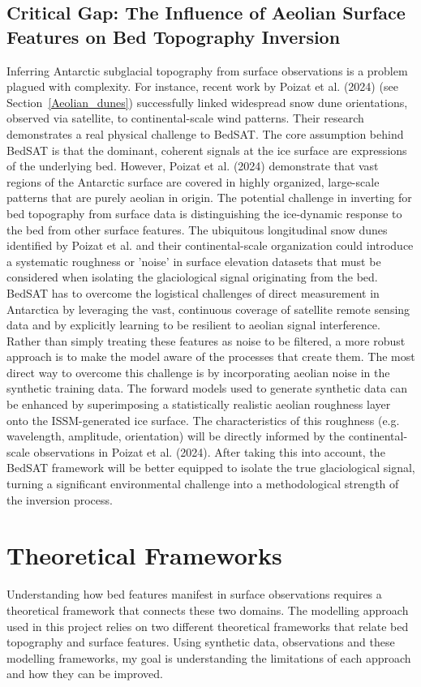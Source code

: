 \subsection{Critical Gap: The Influence of Aeolian Surface Features on Bed Topography Inversion}
Inferring Antarctic subglacial topography from surface observations is a problem plagued with complexity. For instance, recent work by Poizat et al. (2024) (see Section~\ref{Aeolian_dunes}) successfully linked widespread snow dune orientations, observed via satellite, to continental-scale wind patterns. Their research demonstrates a real physical challenge to BedSAT. The core assumption behind BedSAT is that the dominant, coherent signals at the ice surface are expressions of the underlying bed. However, Poizat et al. (2024) demonstrate that vast regions of the Antarctic surface are covered in highly organized, large-scale patterns that are purely aeolian in origin.
The potential challenge in inverting for bed topography from surface data is distinguishing the ice-dynamic response to the bed from other surface features. The ubiquitous longitudinal snow dunes identified by Poizat et al. and their continental-scale organization could introduce a systematic roughness or 'noise' in surface elevation datasets that must be considered when isolating the glaciological signal originating from the bed.
BedSAT has to overcome the logistical challenges of direct measurement in Antarctica by leveraging the vast, continuous coverage of satellite remote sensing data and by explicitly learning to be resilient to aeolian signal interference. Rather than simply treating these features as noise to be filtered, a more robust approach is to make the model aware of the processes that create them. The most direct way to overcome this challenge is by incorporating aeolian noise in the synthetic training data.
The forward models used to generate synthetic data can be enhanced by superimposing a statistically realistic aeolian roughness layer onto the ISSM-generated ice surface. The characteristics of this roughness (e.g. wavelength, amplitude, orientation) will be directly informed by the continental-scale observations in Poizat et al. (2024). 
After taking this into account, the BedSAT framework will be better equipped to isolate the true glaciological signal, turning a significant environmental challenge into a methodological strength of the inversion process.

\newpage
\section{Theoretical Frameworks}\label{theoretical_frameworks}
 Understanding how bed features manifest in surface observations requires a theoretical framework that connects these two domains. The modelling approach used in this project relies on two different theoretical frameworks that relate bed topography and surface features. Using synthetic data, observations and these modelling frameworks, my goal is understanding the limitations of each approach and how they can be improved.

